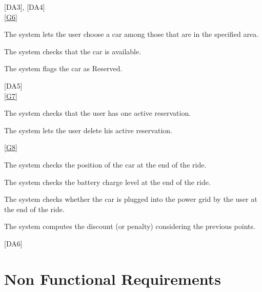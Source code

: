 \documentclass[11pt,a4paper]{report}
\begin{document}
	[DA3], [DA4]\\
\noindent\ref{G6} \\
\begin{Req}[resume]
\item The system lets the user choose a car among those that are in the specified area.
\item The system checks that the car is available.
\item The system flags the car as Reserved.
\end{Req}
[DA5]\\
\noindent\ref{G7} \\
\begin{Req}[resume]
\item The system checks that the user has one active reservation.
\item The system lets the user delete his active reservation.
\end{Req}
\noindent\ref{G8} \\
\begin{Req}[resume]
\item The system checks the position of the car at the end of the ride.
\item The system checks the battery charge level at the end of the ride.
\item The system checks whether the car is plugged into the power grid by the user at the end of the ride.
\item The system computes the discount (or penalty) considering the previous points.
\end{Req}
[DA6]
\section{Non Functional Requirements}
\end{document}
